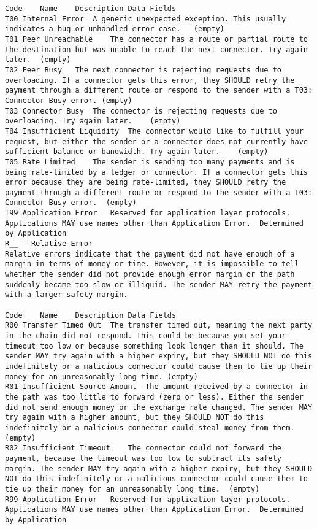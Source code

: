 \documentclass[11pt,twoside,a4paper]{article}
\begin{document}
\begin{verbatim}
Code	Name	Description	Data Fields
T00	Internal Error	A generic unexpected exception. This usually indicates a bug or unhandled error case.	(empty)
T01	Peer Unreachable	The connector has a route or partial route to the destination but was unable to reach the next connector. Try again later.	(empty)
T02	Peer Busy	The next connector is rejecting requests due to overloading. If a connector gets this error, they SHOULD retry the payment through a different route or respond to the sender with a T03: Connector Busy error.	(empty)
T03	Connector Busy	The connector is rejecting requests due to overloading. Try again later.	(empty)
T04	Insufficient Liquidity	The connector would like to fulfill your request, but either the sender or a connector does not currently have sufficient balance or bandwidth. Try again later.	(empty)
T05	Rate Limited	The sender is sending too many payments and is being rate-limited by a ledger or connector. If a connector gets this error because they are being rate-limited, they SHOULD retry the payment through a different route or respond to the sender with a T03: Connector Busy error.	(empty)
T99	Application Error	Reserved for application layer protocols. Applications MAY use names other than Application Error.	Determined by Application
R__ - Relative Error
Relative errors indicate that the payment did not have enough of a margin in terms of money or time. However, it is impossible to tell whether the sender did not provide enough error margin or the path suddenly became too slow or illiquid. The sender MAY retry the payment with a larger safety margin.

Code	Name	Description	Data Fields
R00	Transfer Timed Out	The transfer timed out, meaning the next party in the chain did not respond. This could be because you set your timeout too low or because something look longer than it should. The sender MAY try again with a higher expiry, but they SHOULD NOT do this indefinitely or a malicious connector could cause them to tie up their money for an unreasonably long time.	(empty)
R01	Insufficient Source Amount	The amount received by a connector in the path was too little to forward (zero or less). Either the sender did not send enough money or the exchange rate changed. The sender MAY try again with a higher amount, but they SHOULD NOT do this indefinitely or a malicious connector could steal money from them.	(empty)
R02	Insufficient Timeout	The connector could not forward the payment, because the timeout was too low to subtract its safety margin. The sender MAY try again with a higher expiry, but they SHOULD NOT do this indefinitely or a malicious connector could cause them to tie up their money for an unreasonably long time.	(empty)
R99	Application Error	Reserved for application layer protocols. Applications MAY use names other than Application Error.	Determined by Application

\end{verbatim}


\end{document}
